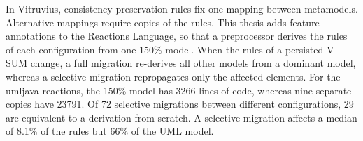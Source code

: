 \Abstract
\label{ch:Abstract}

In Vitruvius, consistency preservation rules fix one mapping between metamodels.
Alternative mappings require copies of the rules.
This thesis adds feature annotations to the Reactions Language, so that a preprocessor derives the rules of each configuration from one 150\% model.
When the rules of a persisted V-SUM change, a full migration re-derives all other models from a dominant model, whereas a selective migration repropagates only the affected elements.
For the umljava reactions, the 150\% model has 3266 lines of code, whereas nine separate copies have 23791.
Of 72 selective migrations between different configurations, 29 are equivalent to a derivation from scratch.
A selective migration affects a median of 8.1\% of the rules but 66\% of the UML model.